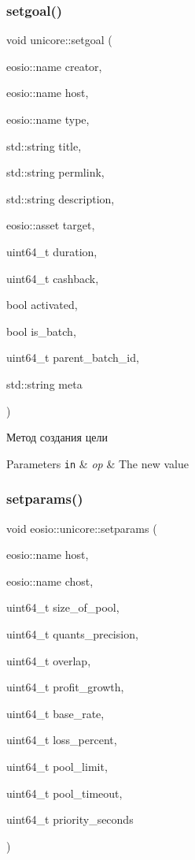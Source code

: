 \subsubsection{\texorpdfstring{setgoal()}{setgoal()}}
{\footnotesize\ttfamily void unicore\+::setgoal (\begin{DoxyParamCaption}\item[{eosio\+::name}]{creator,  }\item[{eosio\+::name}]{host,  }\item[{eosio\+::name}]{type,  }\item[{std\+::string}]{title,  }\item[{std\+::string}]{permlink,  }\item[{std\+::string}]{description,  }\item[{eosio\+::asset}]{target,  }\item[{uint64\+\_\+t}]{duration,  }\item[{uint64\+\_\+t}]{cashback,  }\item[{bool}]{activated,  }\item[{bool}]{is\+\_\+batch,  }\item[{uint64\+\_\+t}]{parent\+\_\+batch\+\_\+id,  }\item[{std\+::string}]{meta }\end{DoxyParamCaption})}



Метод создания цели 


\begin{DoxyParams}[1]{Parameters}
\mbox{\tt in}  & {\em op} & The new value \\
\hline
\end{DoxyParams}
\mbox{\label{classeosio_1_1unicore_ac4def2358ff27c9454fcbbb71163f300}} 
\subsubsection{\texorpdfstring{setparams()}{setparams()}}
{\footnotesize\ttfamily void eosio\+::unicore\+::setparams (\begin{DoxyParamCaption}\item[{eosio\+::name}]{host,  }\item[{eosio\+::name}]{chost,  }\item[{uint64\+\_\+t}]{size\+\_\+of\+\_\+pool,  }\item[{uint64\+\_\+t}]{quants\+\_\+precision,  }\item[{uint64\+\_\+t}]{overlap,  }\item[{uint64\+\_\+t}]{profit\+\_\+growth,  }\item[{uint64\+\_\+t}]{base\+\_\+rate,  }\item[{uint64\+\_\+t}]{loss\+\_\+percent,  }\item[{uint64\+\_\+t}]{pool\+\_\+limit,  }\item[{uint64\+\_\+t}]{pool\+\_\+timeout,  }\item[{uint64\+\_\+t}]{priority\+\_\+seconds }\end{DoxyParamCaption})}



